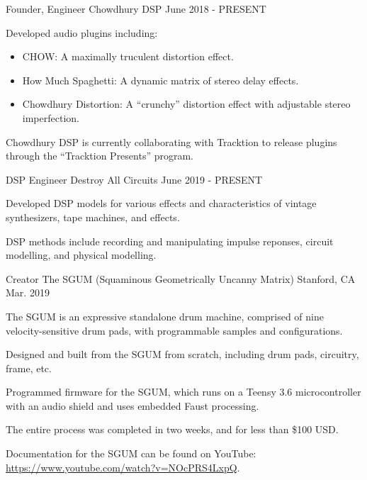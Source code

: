 \begin{cventries}
    \cventry
    {Founder, Engineer} %
    {Chowdhury DSP} %
    {} %
    {June 2018 - PRESENT} %
    {
      \begin{cvitems} %
        \item {Developed audio plugins including:}
        \begin{itemize}
            \item {CHOW: A maximally truculent distortion effect.}
            \item {How Much Spaghetti: A dynamic matrix of stereo delay effects.}
            \item {Chowdhury Distortion: A ``crunchy'' distortion effect with adjustable stereo imperfection.}
        \end{itemize}
        \item {Chowdhury DSP is currently collaborating with Tracktion to release plugins through the ``Tracktion Presents'' program.}
      \end{cvitems}
    }

    \cventry
    {DSP Engineer} %
    {Destroy All Circuits} %
    {} %
    {June 2019 - PRESENT} %
    {
      \begin{cvitems} %
        \item {Developed DSP models for various effects and characteristics of vintage synthesizers, tape machines, and effects.}
        \item {DSP methods include recording and manipulating impulse reponses, circuit modelling, and physical modelling.}
      \end{cvitems}
    }

    \cventry
    {Creator} %
    {The SGUM (Squaminous Geometrically Uncanny Matrix)} %
    {Stanford, CA} %
    {Mar. 2019} %
    {
      \begin{cvitems} %
        \item {The SGUM is an expressive standalone drum machine, comprised of nine velocity-sensitive drum pads, with programmable samples and configurations.}
        \item {Designed and built from the SGUM from scratch, including drum pads, circuitry, frame, etc.}
        \item {Programmed firmware for the SGUM, which runs on a Teensy 3.6 microcontroller with an audio shield and uses embedded Faust processing.}
        \item {The entire process was completed in two weeks, and for less than \$100 USD.}
        \item {Documentation for the SGUM can be found on YouTube: \url{https://www.youtube.com/watch?v=NOcPRS4LxpQ}.}
      \end{cvitems}
    }


\end{cventries}
